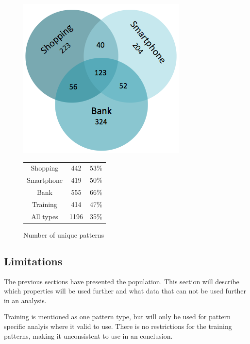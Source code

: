{{    %
    \begin{figure}[H]
      \centering
      \begin{minipage}[b]{0.40\linewidth}
      \centering
        \includegraphics[scale=0.4]{pics/analysis/uniquePatternsVenn.png}
      \end{minipage}%
      \begin{minipage}[b]{0.30\linewidth}
        \centering
        \begin{tabular}{ c | c c}
          \hline
          Shopping &  442 & 53\% \\
          Smartphone & 419 & 50\% \\
          Bank & 555 & 66\% \\
          Training & 414 & 47\% \\ \hline \hline
          All types & 1196 & 35\% \\ \hline
        \end{tabular}
        \vspace{1cm}
      \end{minipage}
      \caption{Number of unique patterns}
      \label{fig:numberofuniqepatterns}
    \end{figure}

  \subsection{Limitations}

    The previous sections have presented the population. This section will describe which properties will be used further and what data that can not be used further in an analysis. 

    Training is mentioned as one pattern type, but will only be used for pattern specific analyis where it valid to use. There is no restrictions for the training patterns, making it unconsistent to use in an conclusion. 

}}
